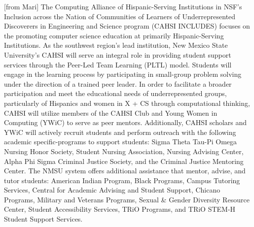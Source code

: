 [from Mari] The Computing Alliance of Hispanic-Serving Institutions in NSF’s Inclusion across the Nation of Communities of Learners of Underrepresented Discoverers in Engineering and Science program (CAHSI INCLUDES) focuses on the promoting computer science education at primarily Hispanic-Serving Institutions. As the southwest region’s lead institution, New Mexico State University’s CAHSI will serve an integral role in providing student support services through the Peer-Led Team Learning (PLTL) model. Students will engage in the learning process by participating in small-group problem solving under the direction of a trained peer leader. In order to facilitate a broader participation and meet the educational needs of underrepresented groups, particularly of Hispanics and women in X + CS through computational thinking, CAHSI will utilize members of the CAHSI Club and Young Women in Computing (YWiC) to serve as peer mentors. Additionally, CAHSI scholars and YWiC will actively recruit students and perform outreach with the following academic specific-programs to support students: Sigma Theta Tau-Pi Omega Nursing Honor Society, Student Nursing Association, Nursing Advising Center, Alpha Phi Sigma Criminal Justice Society, and the Criminal Justice Mentoring Center. The NMSU system offers additional assistance that mentor, advise, and tutor students: American Indian Program, Black Programs, Campus Tutoring Services, Central for Academic Advising and Student Support, Chicano Programs, Military and Veterans Programs, Sexual \& Gender Diversity Resource Center, Student Accessibility Services, TRiO Programs, and TRiO STEM-H Student Support Services. 